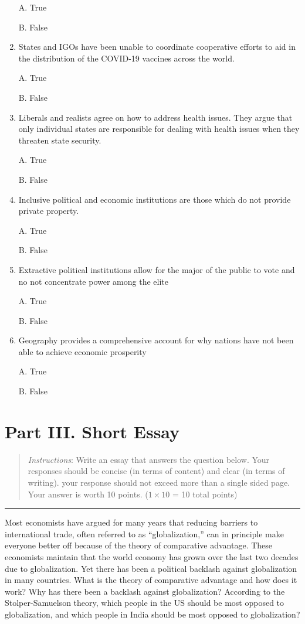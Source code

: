 \documentclass[
]{book}
\begin{document}
\begin{enumerate}
  A. True

  B. False
\item
  States and IGOs have been unable to coordinate cooperative efforts to aid in the distribution of the COVID-19 vaccines across the world.

  A. True

  B. False
\item
  Liberals and realists agree on how to address health issues. They argue that only individual states are responsible for dealing with health issues when they threaten state security.

  A. True

  B. False
\item
  Inclusive political and economic institutions are those which do not provide private property.

  A. True

  B. False
\item
  Extractive political institutions allow for the major of the public to vote and no not concentrate power among the elite

  A. True

  B. False
\item
  Geography provides a comprehensive account for why nations have not been able to achieve economic prosperity

  A. True

  B. False
\end{enumerate}

\hypertarget{part-iii.-short-essay}{%
\section*{Part III. Short Essay}\label{part-iii.-short-essay}}

\begin{quote}
\emph{Instructions}: Write an essay that answers the question below. Your responses should be concise (in terms of content) and clear (in terms of writing). your response should not exceed more than a single sided page. Your answer is worth 10 points. (\(1 \times 10\) = 10 total points)
\end{quote}

\begin{center}\rule{0.5\linewidth}{0.5pt}\end{center}

Most economists have argued for many years that reducing barriers to international trade, often referred to as ``globalization,'' can in principle make everyone better off because of the theory of comparative advantage. These economists maintain that the world economy has grown over the last two decades due to globalization. Yet there has been a political backlash against globalization in many countries. What is the theory of comparative advantage and how does it work? Why has there been a backlash against globalization? According to the Stolper-Samuelson theory, which people in the US should be most opposed to globalization, and which people in India should be most opposed to globalization?

  
\end{document}
